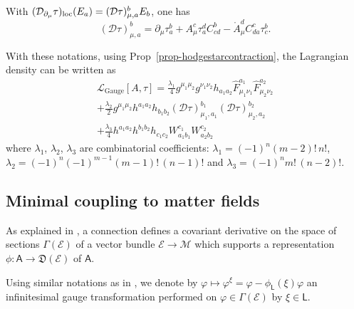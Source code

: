 \documentclass[number]{elsarticle}
\theoremstyle{definition}
\theoremstyle{remark}
\numberwithin{equation}{section}
\begin{document}
 With $({{\mathcal D}}_{\partial_\mu} {\tau})_{{\text{\textup{loc}}}}(E_a) = ({{\mathcal D}} {\tau})_{\mu, a}^b E_b$, one has
\begin{equation*}
({{\mathcal D}} {\tau})_{\mu, a}^b = \partial_\mu{\tau}_a^b + A_\mu^c {\tau}_a^d C_{cd}^b - {{\mathring{{A}}}}_\mu^d C_{da}^c{\tau}_c^b. 
\end{equation*}

With these notations, using Prop~\ref{prop-hodgestarcontraction}, the Lagrangian density can be written as
\begin{multline}
\label{eq-decompositionlocalactiongauge}
{{{{\mathcal{{L}}}}}}_\text{Gauge}[A, {\tau}] = \tfrac{\lambda_1}{4} g^{\mu_1 \mu_2} g^{\nu_1 \nu_2} h_{a_1 a_2} {{\widehat{F}}}_{\mu_1 \nu_1}^{a_1} {{\widehat{F}}}_{\mu_2 \nu_2}^{a_2}
\\
+\tfrac{\lambda_2}{2} g^{\mu_1 \mu_2} h^{a_1 a_2} h_{b_1 b_2} ({{\mathcal D}} {\tau})_{\mu_1, a_1}^{b_1} ({{\mathcal D}} {\tau})_{\mu_2, a_2}^{b_2}
\\
+\tfrac{\lambda_3}{4} h^{a_1 a_2} h^{b_1 b_2} h_{c_1 c_2} W_{a_1 b_1}^{c_1} W_{a_2 b_2}^{c_2}
\end{multline}
where $\lambda_1$, $\lambda_2$, $\lambda_3$ are combinatorial coefficients:
$\lambda_1=(-1)^n(m-2)!\,n!$,
$\lambda_2=(-1)^n(-1)^{m-1}(m-1)!\,(n-1)!$ and
$\lambda_3=(-1)^n m!\,(n-2)!$.

\subsection{Minimal coupling to matter fields}
\label{subsec-matterfields}

As explained in \cite{Mass38}, a connection defines a covariant derivative on the space of sections $\Gamma({{{{\mathcal{{E}}}}}})$ of a vector bundle ${{{{\mathcal{{E}}}}}} \rightarrow {{{{\mathcal{{M}}}}}}$ which supports a representation $\phi : {{{{\mathbf{\mathsf{{A}}}}}}} \rightarrow {{\mathfrak D}}({{{{\mathcal{{E}}}}}})$ of ${{{{\mathbf{\mathsf{{A}}}}}}}$. 

Using similar notations as in \cite{Mass38}, we denote by $\varphi \mapsto  \varphi^\xi = \varphi - \phi_{{{{\mathbf{\mathsf{{L}}}}}}}(\xi)\varphi$ an infinitesimal gauge transformation performed on $\varphi \in \Gamma({{{{\mathcal{{E}}}}}})$ by $\xi \in {{{{\mathbf{\mathsf{{L}}}}}}}$.
\end{document}

